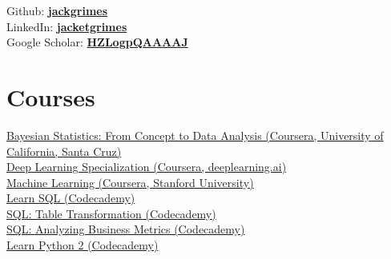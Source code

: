 \documentclass[]{cv-template}
\begin{document}
\begin{minipage}[t]{0.33\textwidth}
Github: \href{https://github.com/jackgrimes}{\bf jackgrimes} \\
LinkedIn: \href{https://www.linkedin.com/in/jacketgrimes}{\bf jacketgrimes} \\
Google Scholar: \href{https://scholar.google.co.uk/citations?hl=en&user=HZLogpQAAAAJ}{\bf HZLogpQAAAAJ} \\
\sectionsep


\section{Courses}
\href{https://www.coursera.org/learn/bayesian-statistics}{Bayesian Statistics: From Concept to Data Analysis (Coursera, University of California, Santa Cruz)}\\
\vspace{1.5mm} %
\href{https://www.coursera.org/specializations/deep-learning}{Deep Learning Specialization (Coursera, deeplearning.ai)}\\
\vspace{1.5mm} %
\href{https://www.coursera.org/learn/machine-learning}{Machine Learning (Coursera, Stanford University)} \\
\vspace{1.5mm} %
\href{https://www.codecademy.com/learn/learn-sql}{Learn SQL (Codecademy)} \\
\vspace{1.5mm} %
\href{https://www.codecademy.com/learn/sql-table-transformation}{SQL: Table Transformation (Codecademy)} \\
\vspace{1.5mm} %
\href{https://www.codecademy.com/learn/sql-analyzing-business-metrics}{SQL: Analyzing Business Metrics (Codecademy)} \\
\vspace{1.5mm} %
\href{https://www.codecademy.com/learn/learn-python}{Learn Python 2 (Codecademy)} \\
\sectionsep


\end{minipage}
\end{document}
